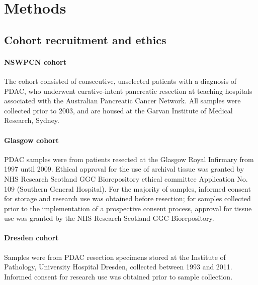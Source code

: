 \documentclass[dissertation.tex]{subfiles}
\begin{document}

\section{Methods}
\subsection{Cohort recruitment and ethics}
\label{subsec:nomo-methods-cohort}
\paragraph{NSWPCN cohort}
The cohort consisted of consecutive, unselected patients with a diagnosis of \gls{PDAC}, who underwent curative-intent pancreatic resection at teaching hospitals associated with the Australian Pancreatic Cancer Network.  All samples were collected prior to 2003, and are housed at the Garvan Institute of Medical Research, Sydney.

\paragraph{Glasgow cohort}
\gls{PDAC} samples were from patients resected at the Glasgow Royal Infirmary from 1997 until 2009.  Ethical approval for the use of archival tissue was granted by NHS Research Scotland GGC Biorepository ethical committee Application No. 109 (Southern General Hospital). For the majority of samples, informed consent for storage and research use was obtained before resection; for samples collected prior to the implementation of a prospective consent process, approval for tissue use was granted by the NHS Research Scotland GGC Biorepository.

\paragraph{Dresden cohort}
Samples were from \gls{PDAC} resection specimens stored at the Institute of Pathology, University Hospital Dresden, collected between 1993 and 2011.  Informed consent for research use was obtained prior to sample collection.
\end{document}

